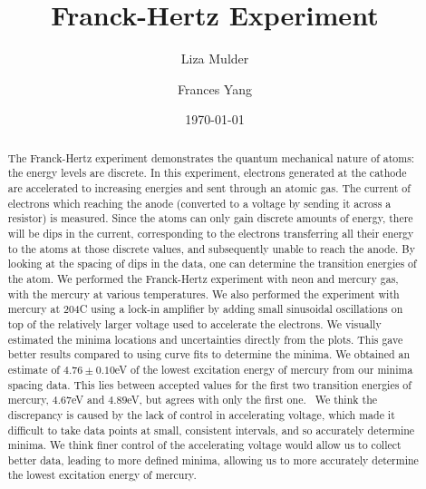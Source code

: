 \documentclass[prb,preprint]{revtex4-1}
\begin{document}

\title{Franck-Hertz Experiment}


\author{Liza Mulder}


\author{Frances Yang}


\date{\today}



\begin{abstract}
The Franck-Hertz experiment demonstrates the quantum mechanical nature of atoms: the energy levels are discrete. 
In this experiment, electrons generated at the cathode are accelerated to increasing energies and sent through an atomic gas. The current of electrons which reaching the anode (converted to a voltage by sending it across a resistor) is measured. 
Since the atoms can only gain discrete amounts of energy, there will be dips in the current, corresponding to the electrons transferring all their energy to the atoms at those discrete values, and subsequently unable to reach the anode.
By looking at the spacing of dips in the data, one can determine the transition energies of the atom. 
We performed the Franck-Hertz experiment with neon and mercury gas, with the mercury at various temperatures. 
We also performed the experiment with mercury at 204\degree C using a lock-in amplifier by adding small sinusoidal oscillations on top of the relatively larger voltage used to accelerate the electrons.
We visually estimated the minima locations and uncertainties directly from the plots. 
This gave better results compared to using curve fits to determine the minima.
We obtained an estimate of $4.76\pm 0.10$eV of the lowest excitation energy of mercury from our minima spacing data.
This lies between accepted values for the first two transition energies of mercury,  $4.67$eV and $4.89$eV, but agrees with only the first one.~\cite{new}
We think the discrepancy is caused by the lack of control in accelerating voltage, which made it difficult to take data points at small, consistent intervals, and so accurately determine minima.
We think finer control of the accelerating voltage would allow us to collect better data, leading to more defined minima, allowing us to more accurately determine the lowest excitation energy of mercury. 
\end{abstract}
\end{document}
